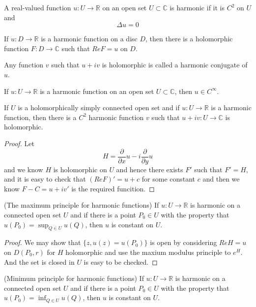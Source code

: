 \documentclass[lang=en, color=blue, ]{elegantbook}
\newcommand{\R}{\mathbb{R}}
\newcommand{\C}{\mathbb{C}}
\newcommand{\ParX}{\dfrac{\partial}{\partial x}}
\newcommand{\ParY}{\dfrac{\partial}{\partial y}}
\begin{document}
\begin{definition}
    A real-valued function $u:U\to\R$ on an open set $U\subset \C$ is harmonic if it is $C^2$ on $U$ and
    \[\Delta u = 0\]
\end{definition}

\begin{lemma}
    If $u:D\to \R$ is a harmonic function on a disc $D$, then there is a holomorphic function $F:D\to\C$ such that $Re F = u$ on $D$.
\end{lemma}

\begin{definition}
    Any function $v$ such that $u+iv$ is holomorphic is called a harmonic conjugate of $u$.
\end{definition}

\begin{corollary}
    If $u:U\to\R$ is a harmonic function on an open set $U\subset\C$, then $u\in C^{\infty}$.
\end{corollary}

\begin{lemma}
    If $U$ is a holomorphically simply connected open set and if $u:U\to\R$ is a harmonic function, then there is a $C^2$ harmonic function $v$ such that $u+iv:U\to \C$ is holomorphic.
\end{lemma}
\begin{proof}
    Let
    \[H = \ParX u - i \ParY u\]
    and we know $H$ is holomorphic on $U$ and hence  there exists $F'$ such that $F' = H$, and it is easy to check that $(ReF) ' = u+c$ for some constant $c$ and then we know $F-C = u + iv'$ is the required funcition.
\end{proof}

\begin{theorem}
    (The maximum principle for harmonic functions) If $u:U\to\R$ is harmonic on a connected open set $U$ and if there is a point $P_0 \in U$ with the property that $u(P_0) = \sup_{Q\in U}u(Q)$, then $u$ is constant on $U$.
\end{theorem}
\begin{proof}
    We may show that $\{z, u(z) = u(P_0)\}$ is open by considering $ReH = u$ on $D(P_0,r)$ for $H$ holomorphic and use the maxium modulus principle to $e^H$. And the set is closed in $U$ is easy to be checked.
\end{proof}

\begin{corollary}
    (Minimum principle for harmonic functions) If $u:U\to\R$ is harmonic on a connected open set $U$ and if there is a point $P_0 \in U$ with the property that $u(P_0) = \inf_{Q\in U}u(Q)$, then $u$ is constant on $U$.
\end{corollary}
\end{document}
